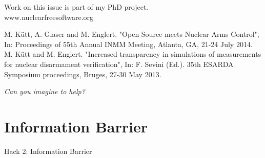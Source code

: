 \documentclass[presentation]{beamer}
\begin{document}
\begin{frame}[label=sec-3-8]{}

\begin{center}

Work on this issue is part of my PhD project.\\[1em]

www.nuclearfreesoftware.org \\[3em]
\end{center}


\footnotesize

M. Kütt, A. Glaser and M. Englert. "Open Source meets Nuclear Arms Control", In: Proceedings of 55th Annual INMM Meeting, Atlanta, GA, 21-24 July 2014.\\[0.3em]

M. Kütt and M. Englert. "Increased transparency in simulations of measurements for nuclear disarmament verification", In: F. Sevini (Ed.). 35th ESARDA Symposium proceedings, Bruges, 27-30 May 2013.


\pause

\normalsize

\vspace{0.8cm}

\begin{center}
\emph{Can you imagine to help?}
\end{center}
\end{frame}

\section{Information Barrier}
\label{sec-4}
\begin{frame}[label=sec-4-1]{}

\begin{center}
Hack 2: Information Barrier
\end{center}
\end{frame}
\end{document}
